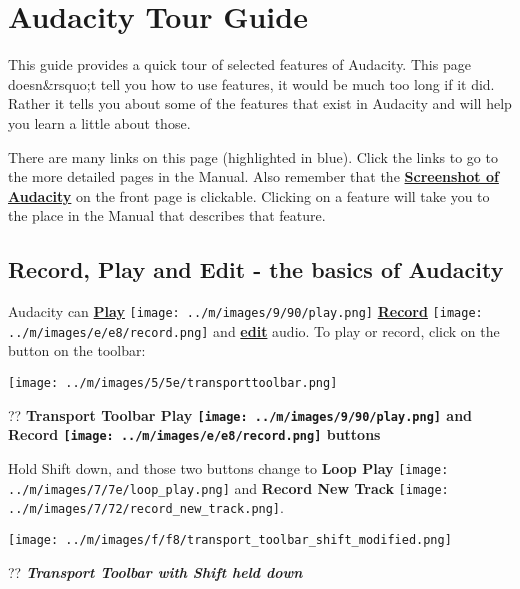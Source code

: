 \documentclass[]{book}
\begin{document}
\chapter{Audacity Tour Guide}

\label{f42}\begin{multicols}{2}																																						

This guide provides a quick tour of selected features of Audacity.  This page doesn\&rsquo;t tell you how to use features, it would be much too long if it did.  Rather it tells you about some of the features that exist in Audacity and will help you learn a little about those.

There are many links on this page (highlighted in blue). Click the links to go to the more detailed pages in the Manual. 
Also remember that the \textbf{
\hyperref[index__reference]{Screenshot of Audacity}
} on the front page is clickable.  Clicking on a feature will take you to the place in the Manual that describes that feature. 



\section{Record, Play and Edit - the basics of Audacity}


Audacity can \textbf{
\hyperref[playback_]{Play}
} \texttt{[image: ../m/images/9/90/play.png]} \textbf{
\hyperref[recording_]{Record}
} \texttt{[image: ../m/images/e/e8/record.png]} and  \textbf{
\hyperref[edit_]{edit}
} audio.  To play or record, click on the button on the toolbar:\par\texttt{[image: ../m/images/5/5e/transporttoolbar.png]}\par??
\textbf{Transport Toolbar Play \texttt{[image: ../m/images/9/90/play.png]} and Record \texttt{[image: ../m/images/e/e8/record.png]} buttons}


Hold Shift down, and those two buttons change to \textbf{Loop Play} \texttt{[image: ../m/images/7/7e/loop\_play.png]} and \textbf{Record New Track} \texttt{[image: ../m/images/7/72/record\_new\_track.png]}.\par\texttt{[image: ../m/images/f/f8/transport\_toolbar\_shift\_modified.png]}\par??
\textit{\textbf{Transport Toolbar with Shift held down}}


\end{multicols}
\end{document}
